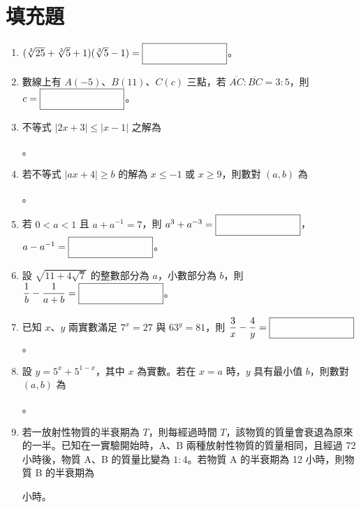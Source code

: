 \documentclass[12pt]{article}
\newcommand*{\blank}[1]{\rule[-.7\baselineskip]{0pt}{1.8\baselineskip}\fbox{\rule[-.4\baselineskip]{0pt}{1.2\baselineskip}\hspace{#1}}}
\newcommand*{\fraction}[2]{\rule[-.8\baselineskip]{0pt}{2\baselineskip}\dfrac{#1}{#2}}
\begin{document}
\section{填充題}
\begin{enumerate}[label=\Alph*.,align=left,leftmargin=*,labelsep=.6em]
  \item $(\sqrt[3]{25}+\sqrt[3]{5}+1)(\sqrt[3]{5}-1) = \blank{8em}$。
  \item 數線上有 $A(-5)$、$B(11)$、$C(c)$ 三點，若 $\overline{AC}:\overline{BC} = 3:5$，則 $c = \blank{8em}$。
  \item 不等式 $\lvert 2x + 3 \rvert \leq \lvert x - 1 \rvert$ 之解為 \blank{10em}。
  \item 若不等式 $\lvert ax + 4 \rvert \geq b$ 的解為 $x \leq -1$ 或 $x \geq 9$，則數對 $(a, b)$ 為 \blank{8em}。
  \item 若 $0 < a < 1$ 且 $a + a^{-1} = 7$，則 $a^3 + a^{-3} = \blank{8em}$，$a - a^{-1} = \blank{8em}$。
  \item 設 $\sqrt{11+4\sqrt{7}}$ 的整數部分為 $a$，小數部分為 $b$，則 $\fraction{1}{b} - \fraction{1}{a+b} = \blank{8em}$。
  \item 已知 $x$、$y$ 兩實數滿足 $7^x = 27$ 與 $63^y = 81$，則 $\fraction{3}{x} - \fraction{4}{y} = \blank{8em}$。
  \item 設 $y = 5^x + 5^{1-x}$，其中 $x$ 為實數。若在 $x = a$ 時，$y$ 具有最小值 $b$，則數對 $(a, b)$ 為 \blank{8em}。
  \item 若一放射性物質的半衰期為 $T$，則每經過時間 $T$，該物質的質量會衰退為原來的一半。已知在一實驗開始時，A、B 兩種放射性物質的質量相同，且經過 72 小時後，物質 A、B 的質量比變為 $1:4$。若物質 A 的半衰期為 12 小時，則物質 B 的半衰期為 \blank{8em} 小時。
\end{enumerate}

\end{document}
